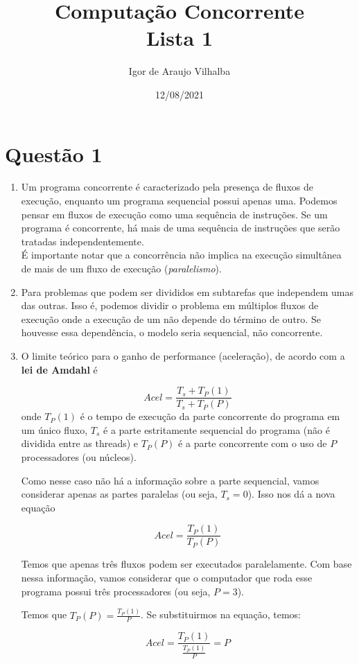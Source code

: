 \documentclass{article}
\title{\Large \textbf{Computação Concorrente}
	\vspace{0.5em}\\
	\large Lista 1
}
\author{Igor de Araujo Vilhalba}
\date{12/08/2021}
\begin{document}
\maketitle

\section*{Questão 1}

\begin{enumerate}[label=\textbf{\alph*)}]
	\item Um programa concorrente é caracterizado pela presença de fluxos de execução,
		enquanto um programa sequencial possui apenas uma. Podemos pensar em fluxos
		de execução como uma sequência de instruções. Se um programa é concorrente,
		há mais de uma sequência de instruções que serão tratadas independentemente.\\
		É importante notar que a concorrência não implica na execução simultânea de
		mais de um fluxo de execução (\emph{paralelismo}).
	\item Para problemas que podem ser divididos em subtarefas que independem umas das
		outras. Isso é, podemos dividir o problema em múltiplos fluxos de execução
		onde a execução de um não depende do término de outro. Se houvesse essa
		dependência, o modelo seria sequencial, não concorrente.
	\item O limite teórico para o ganho de performance (aceleração), de acordo com
		a \textbf{lei de Amdahl} é
		\begin{center}
			$$
			Acel = \frac{T_s + T_P(1)}{T_s+T_P(P)}
			$$
			onde $T_P(1)$ é o tempo de execução da parte concorrente do programa
			em um único fluxo, $T_s$ é a parte estritamente sequencial do programa
			(não é dividida entre as threads) e $T_P(P)$ é a parte concorrente com
			o uso de $P$ processadores (ou núcleos).
		\end{center}
		Como nesse caso não há a informação sobre a parte sequencial, vamos considerar apenas
		as partes paralelas (ou seja, $T_s = 0$). Isso nos dá a nova equação
		\begin{center}
			$$
			Acel = \frac{T_P(1)}{T_P(P)}
			$$
		\end{center}
		Temos que apenas três fluxos podem ser executados paralelamente. Com base nessa informação,
		vamos considerar que o computador que roda esse programa possui três processadores (ou seja, $P=3$).

		Temos que $T_P(P) = \frac{T_P(1)}{P}$. Se substituirmos na equação, temos:
		\begin{center}
			\[
			Acel = \frac{T_P(1)}{\frac{T_P(1)}{P}} = P
			\]
		\end{center}


\end{enumerate}
\end{document}
